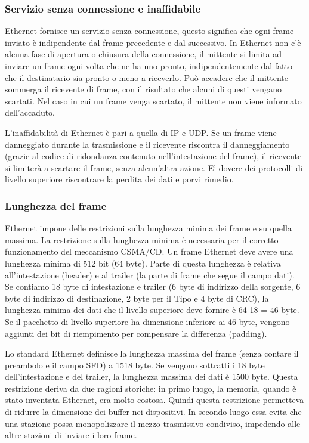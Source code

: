 \subsubsection{Servizio senza connessione e inaffidabile}
Ethernet fornisce un servizio senza connessione, questo significa che ogni frame inviato è indipendente dal frame precedente e dal successivo. In Ethernet non c'è alcuna fase di apertura o chiusura della connessione, il mittente si limita ad inviare un frame ogni volta che ne ha uno pronto, indipendentemente dal fatto che il destinatario sia pronto o meno a riceverlo. Può accadere che il mittente sommerga il ricevente di frame, con il risultato che alcuni di questi vengano scartati. Nel caso in cui un frame venga scartato, il mittente non viene informato dell'accaduto.

L'inaffidabilità di Ethernet è pari a quella di IP e UDP. Se un frame viene danneggiato durante la trasmissione e il ricevente riscontra il danneggiamento (grazie al codice di ridondanza contenuto nell'intestazione del frame), il ricevente si limiterà a scartare il frame, senza alcun'altra azione. E' dovere dei protocolli di livello superiore riscontrare la perdita dei dati e porvi rimedio.

\subsubsection{Lunghezza del frame}
Ethernet impone delle restrizioni sulla lunghezza minima dei frame e su quella massima. La restrizione sulla lunghezza minima è necessaria per il corretto funzionamento del meccanismo CSMA/CD. Un frame Ethernet deve avere una lunghezza minima di 512 bit (64 byte). Parte di questa lunghezza è relativa all'intestazione (header) e al trailer (la parte di frame che segue il campo dati). Se contiamo 18 byte di intestazione e trailer (6 byte di indirizzo della sorgente, 6 byte di indirizzo di destinazione, 2 byte per il Tipo e 4 byte di CRC), la lunghezza minima dei dati che il livello superiore deve fornire è 64-18 = 46 byte. Se il pacchetto di livello superiore ha dimensione inferiore ai 46 byte, vengono aggiunti dei bit di riempimento per compensare la differenza (padding).

Lo standard Ethernet definisce la lunghezza massima del frame (senza contare il preambolo e il campo SFD) a 1518 byte. Se vengono sottratti i 18 byte dell'intestazione e del trailer, la lunghezza massima dei dati è 1500 byte. Questa restrizione deriva da due ragioni storiche: in primo luogo, la memoria, quando è stato inventata Ethernet, era molto costosa. Quindi questa restrizione permetteva di ridurre la dimensione dei buffer nei dispositivi. In secondo luogo essa evita che una stazione possa monopolizzare il mezzo trasmissivo condiviso, impedendo alle altre stazioni di inviare i loro frame.

